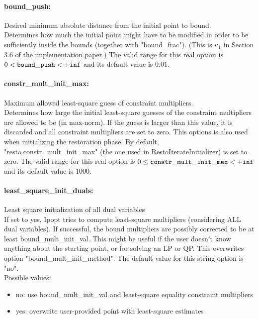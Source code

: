 \paragraph{bound\_push:}\label{sec:bound_push} Desired minimum absolute distance from the initial point to bound. $\;$ \\
 Determines how much the initial point might have
to be modified in order to be sufficiently inside
the bounds (together with "bound\_frac").  (This
is $\kappa_1$ in Section 3.6 of the implementation
paper.) The valid range for this real option is 
$0 <  {\tt bound\_push } <  {\tt +inf}$
and its default value is $0.01$.


\paragraph{constr\_mult\_init\_max:}\label{sec:constr_mult_init_max} Maximum allowed least-square guess of constraint multipliers. $\;$ \\
 Determines how large the initial least-square
guesses of the constraint multipliers are allowed
to be (in max-norm). If the guess is larger than
this value, it is discarded and all constraint
multipliers are set to zero.  This options is
also used when initializing the restoration
phase. By default,
"resto.constr\_mult\_init\_max" (the one used in
RestoIterateInitializer) is set to zero. The valid range for this real option is 
$0 \le {\tt constr\_mult\_init\_max } <  {\tt +inf}$
and its default value is $1000$.


\paragraph{least\_square\_init\_duals:}\label{sec:least_square_init_duals} Least square initialization of all dual variables $\;$ \\
 If set to yes, Ipopt tries to compute
least-square multipliers (considering ALL dual
variables).  If successful, the bound multipliers
are possibly corrected to be at least
bound\_mult\_init\_val. This might be useful if
the user doesn't know anything about the starting
point, or for solving an LP or QP.  This
overwrites option "bound\_mult\_init\_method".
The default value for this string option is "no".
\\ 
Possible values:
\begin{itemize}
   \item no: use bound\_mult\_init\_val and least-square
equality constraint multipliers
   \item yes: overwrite user-provided point with least-square
estimates
\end{itemize}

